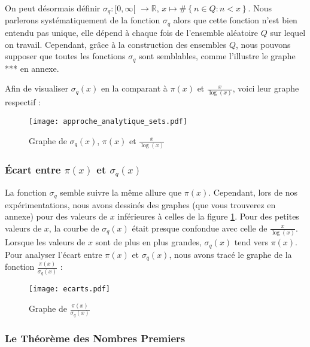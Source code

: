 \documentclass[../main.tex]{report}
\begin{document}
On peut désormais définir $ \sigma_{q} : [0, \infty [$  $\rightarrow \mathbb{R} $, $ x \mapsto \# \left\{ n \in Q : n < x \right\} $. Nous parlerons systématiquement de  la fonction $\sigma_{q}$ alors que cette fonction n'est bien entendu pas unique, elle dépend à chaque fois de l'ensemble aléatoire $Q$ sur lequel on travail. Cependant, grâce à la construction des ensembles $Q$, nous pouvons supposer que toutes les fonctions $\sigma_{q}$ sont semblables, comme l'illustre le graphe *** en annexe. 

Afin de visualiser  $\sigma_{q}(x)$ en la comparant à $\pi(x)$ et $\frac{x}{\log(x)}$, voici leur graphe respectif : 

\begin{figure}[H]
\centering
\texttt{[image: approche\_analytique\_sets.pdf]}
\caption{Graphe de $\sigma_{q}(x)$, $\pi(x)$ et $\frac{x}{\log(x)}$ }
\label{im:image1}
\end{figure}

\subsubsection{Écart entre $\pi(x)$ et $\sigma_{q}(x)$}

La fonction $\sigma_{q}$ semble suivre la même allure que $\pi(x)$. Cependant, lors de nos expérimentations, nous avons dessinés des graphes (que vous trouverez en annexe) pour des valeurs de $x$ inférieures à celles de la figure \ref{im:image1}. Pour des petites valeurs de $x$, la courbe de $\sigma_{q}(x)$ était presque confondue avec celle de $\frac{x}{\log(x)}$. Lorsque les valeurs de $x$ sont de plus en plus grandes, $\sigma_{q}(x)$ tend vers $\pi(x)$. Pour analyser l'écart entre $\pi(x)$ et $\sigma_{q}(x)$, nous avons tracé le graphe de la fonction $\frac{\pi(x)}{\sigma_{q}(x)}$ : 

\begin{figure}[H]
\centering
\texttt{[image: ecarts.pdf]}
\caption{Graphe de $\frac{\pi(x)}{\sigma_{q}(x)}$ }
\label{im:image2}
\end{figure}

\subsubsection{Le Théorème des Nombres Premiers}
\end{document}
